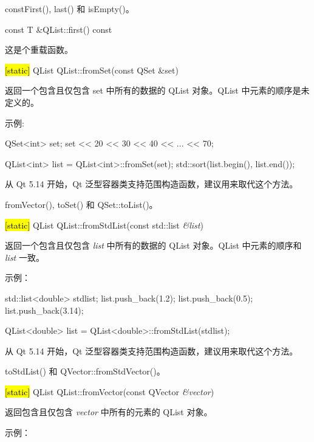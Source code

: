 \begin{seeAlso}
constFirst(), last() 和 isEmpty()。
\end{seeAlso}

const T \&QList::first() const

这是个重载函数。

\hl{[static]} QList QList::fromSet(const QSet \&set)

返回一个包含且仅包含 set 中所有的数据的 QList 对象。QList 中元素的顺序是未定义的。

示例:


\begin{cppcode}
QSet<int> set;
set << 20 << 30 << 40 << ... << 70;

QList<int> list = QList<int>::fromSet(set);
std::sort(list.begin(), list.end());
\end{cppcode}

\begin{notice}
从 Qt 5.14 开始，Qt 泛型容器类支持范围构造函数，建议用来取代这个方法。
\end{notice}


\begin{seeAlso}
fromVector(), toSet() 和 QSet::toList()。
\end{seeAlso}


\hl{[static]} QList QList::fromStdList(const std::list \emph{\&list})

返回一个包含且仅包含 \emph{list} 中所有的数据的 QList 对象。QList 中元素的顺序和 \emph{list} 一致。

示例：


\begin{cppcode}
std::list<double> stdlist;
list.push_back(1.2);
list.push_back(0.5);
list.push_back(3.14);

QList<double> list = QList<double>::fromStdList(stdlist);
\end{cppcode}


\begin{notice}
从 Qt 5.14 开始，Qt 泛型容器类支持范围构造函数，建议用来取代这个方法。
\end{notice}


\begin{seeAlso}
toStdList() 和 QVector::fromStdVector()。
\end{seeAlso}


\hl{[static]} QList QList::fromVector(const QVector \emph{\&vector})

返回包含且仅包含 \emph{vector} 中所有的元素的 QList 对象。

示例：


